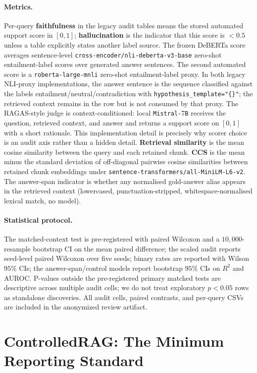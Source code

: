 \paragraph{Metrics.} Per-query \textbf{faithfulness} in the legacy
audit tables means the stored automated support score in $[0,1]$;
\textbf{hallucination} is the indicator that this score is $<0.5$
unless a table explicitly states another label source. The frozen
DeBERTa score averages sentence-level
\texttt{cross-encoder/nli-deberta-v3-base} zero-shot entailment-label
scores over generated answer sentences. The second automated score is a
\texttt{roberta-large-mnli} zero-shot entailment-label proxy. In both
legacy NLI-proxy implementations, the answer sentence is the sequence
classified against the labels entailment/neutral/contradiction with
\texttt{hypothesis\_template="\{\}"}; the retrieved context remains in
the row but is not consumed by that proxy. The RAGAS-style judge is
context-conditioned: local \texttt{Mistral-$7$B} receives the question,
retrieved context, and answer and returns a support score on $[0,1]$
with a short rationale. This implementation detail is precisely why
scorer choice is an audit axis rather than a hidden detail.
\textbf{Retrieval similarity} is the mean cosine similarity between the
query and each retained chunk. \textbf{CCS} is the mean minus the
standard deviation of off-diagonal pairwise cosine similarities between
retained chunk embeddings under
\texttt{sentence-transformers/all-MiniLM-L6-v2}. The answer-span
indicator is whether any normalised gold-answer alias appears in the
retrieved context (lowercased, punctuation-stripped,
whitespace-normalised lexical match, no model).

\paragraph{Statistical protocol.} The matched-context test is
pre-registered with paired Wilcoxon and a $10{,}000$-resample
bootstrap CI on the mean paired difference; the scaled audit reports
seed-level paired Wilcoxon over five seeds; binary rates are reported
with Wilson $95\%$ CIs; the answer-span/control models report bootstrap
$95\%$ CIs on $R^2$ and AUROC. P-values outside the pre-registered
primary matched tests are descriptive across multiple audit cells; we
do not treat exploratory $p<0.05$ rows as standalone discoveries. All
audit cells, paired contrasts, and per-query CSVs are included in the
anonymized review artifact.

\section{ControlledRAG: The Minimum Reporting Standard}
\label{sec:controlledrag}

